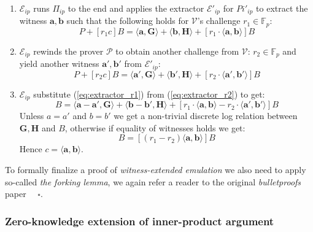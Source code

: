 \documentclass[../lecture-notes-148x210.tex]{subfiles}
\begin{document}
\begin{enumerate}
    \item $\mathcal{E}_{ip}$ runs $\Pi_{ip}$ to the end and applies the extractor $\mathcal{E}'_{ip}$ for $Pi'_{ip}$ to extract the witness $\mathbf{a,b}$ such that the following holds for $\mathcal{V}$'s challenge $r_1 \in \mathbb{F}_p$: 
        \begin{equation}
            P + [r_1c]B = \langle \mathbf{a,G} \rangle + \langle \mathbf{b,H} \rangle + [r_1 \cdot \langle \mathbf{a,b} \rangle]B
            \label{eq:extractor_r1}
        \end{equation}
    \item $\mathcal{E}_{ip}$ rewinds the prover $\mathcal{P}$ to obtain another challenge from $\mathcal{V}$: $r_2 \in \mathbb{F}_p$ and yield another witness $\mathbf{a',b'}$ from $\mathcal{E}'_{ip}$:
        \begin{equation}
            P + [r_2c]B = \langle \mathbf{a',G} \rangle + \langle \mathbf{b',H} \rangle + [r_2 \cdot \langle \mathbf{a',b'} \rangle]B
            \label{eq:extractor_r2}
        \end{equation}
        
    \item $\mathcal{E}_{ip}$ substitute (\ref{eq:extractor_r1}) from (\ref{eq:extractor_r2}) to get:
        \begin{equation}
            [c(r_1 - r_2)]B = \langle \mathbf{a-a',G} \rangle + \langle \mathbf{b-b',H} \rangle + [r_1 \cdot \langle \mathbf{a,b} \rangle - r_2 \cdot \langle \mathbf{a',b'} \rangle]B
        \end{equation}
        Unless $a = a'$ and $b = b'$ we get a non-trivial discrete log relation between $\mathbf{G,H}$ and $B$, otherwise if equality of witnesses holds we get:
        \begin{equation}
            [(r_1 - r_2)c]B = [(r_1 - r_2) \langle \mathbf{a,b} \rangle]B
        \end{equation}
        Hence $c = \langle \mathbf{a,b} \rangle$.
\end{enumerate}

To formally finalize a proof of \textit{witness-extended emulation} we also need to apply so-called \textit{the forking lemma}, we again refer a reader to the original \textit{bulletproofs} paper \cite{bulletproofs} $\quad \square$.

\subsubsection{Zero-knowledge extension of inner-product argument}\label{subsection:alternative-zk-ip}
\end{document}
